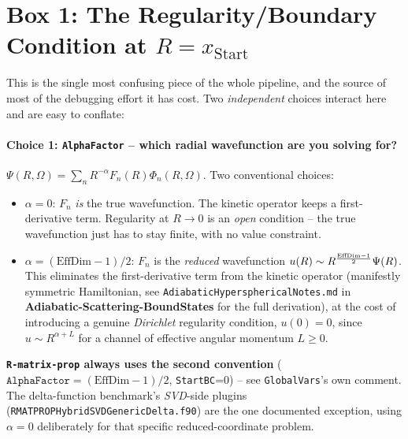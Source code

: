 \documentclass[11pt]{article}
\newcommand{\file}[1]{\texttt{#1}}
\newcommand{\repo}[1]{\textbf{#1}}
\begin{document}
\section{Box 1: The Regularity/Boundary Condition at $R=x_{\mathrm{Start}}$}
\label{sec:box1bc}

This is the single most confusing piece of the whole pipeline, and the source of most of the
debugging effort it has cost. Two \emph{independent} choices interact here and are easy to
conflate:

\paragraph{Choice 1: \texttt{AlphaFactor} -- which radial wavefunction are you solving for?}
$\Psi(R,\Omega)=\sum_n R^{-\alpha}F_n(R)\Phi_n(R,\Omega)$. Two conventional choices:
\begin{itemize}
\item $\alpha=0$: $F_n$ \emph{is} the true wavefunction. The kinetic operator keeps a first-
  derivative term. Regularity at $R\to0$ is an \emph{open} condition -- the true wavefunction just
  has to stay finite, with no value constraint.
\item $\alpha=(\text{EffDim}-1)/2$: $F_n$ is the \emph{reduced} wavefunction $u(R)\sim
  R^{\text{EffDim}-1\over2}\Psi(R)$. This eliminates the first-derivative term from the kinetic
  operator (manifestly symmetric Hamiltonian, see \texttt{AdiabaticHypersphericalNotes.md} in
  \repo{Adiabatic-Scattering-BoundStates} for the full derivation), at the cost of introducing a
  genuine \emph{Dirichlet} regularity condition, $u(0)=0$, since $u\sim R^{\alpha+L}$ for a channel
  of effective angular momentum $L\ge0$.
\end{itemize}
\textbf{\texttt{R-matrix-prop} always uses the second convention}
($\texttt{AlphaFactor}=(\text{EffDim}-1)/2$, \texttt{StartBC}=0) -- see \texttt{GlobalVars}'s own
comment. The delta-function benchmark's \emph{SVD}-side plugins
(\file{RMATPROPHybridSVDGenericDelta.f90}) are the one documented exception, using
$\alpha=0$ deliberately for that specific reduced-coordinate problem.
\end{document}
